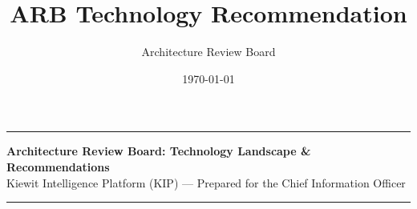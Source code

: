 \documentclass[10pt, a4paper]{article}
\title{ARB Technology Recommendation}
\author{Architecture Review Board}
\date{\today}
\begin{document}
\pagestyle{fancy}
\renewcommand{\thepage}{\arabic{page}}
\thispagestyle{fancy}

\begin{center}
    \noindent\rule{\linewidth}{1.5pt}
    
    \vspace{0.05em}
    
    {\large \textbf{Architecture Review Board: Technology Landscape \& Recommendations}} \\[0.05em]
    {\footnotesize Kiewit Intelligence Platform (KIP) --- Prepared for the Chief Information Officer}
    
    \vspace{0.05em}
    
    \noindent\rule{\linewidth}{1.5pt}
\end{center}

\vspace{0.1em}
\end{document}
